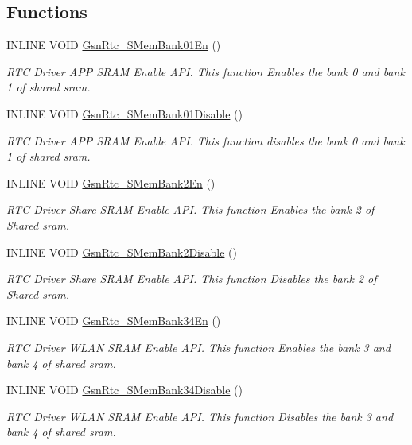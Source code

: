 \subsection*{Functions}
\begin{DoxyCompactItemize}
\item 
INLINE VOID \hyperlink{a00651_ga6b4bcb149ee20725f2fc899a65d7fdf9}{GsnRtc\_\-SMemBank01En} ()
\begin{DoxyCompactList}\small\item\em RTC Driver APP SRAM Enable API. This function Enables the bank 0 and bank 1 of shared sram. \end{DoxyCompactList}\item 
INLINE VOID \hyperlink{a00651_ga7adb0e944f2c0f0dfffddd0afca63382}{GsnRtc\_\-SMemBank01Disable} ()
\begin{DoxyCompactList}\small\item\em RTC Driver APP SRAM Enable API. This function disables the bank 0 and bank 1 of shared sram. \end{DoxyCompactList}\item 
INLINE VOID \hyperlink{a00651_ga7540c91773261a93185b2bef4969277a}{GsnRtc\_\-SMemBank2En} ()
\begin{DoxyCompactList}\small\item\em RTC Driver Share SRAM Enable API. This function Enables the bank 2 of Shared sram. \end{DoxyCompactList}\item 
INLINE VOID \hyperlink{a00651_gae72a40c37c187ab506437b3592a59cf2}{GsnRtc\_\-SMemBank2Disable} ()
\begin{DoxyCompactList}\small\item\em RTC Driver Share SRAM Enable API. This function Disables the bank 2 of Shared sram. \end{DoxyCompactList}\item 
INLINE VOID \hyperlink{a00651_ga7b62ca77d978a7abc09284be65ea845e}{GsnRtc\_\-SMemBank34En} ()
\begin{DoxyCompactList}\small\item\em RTC Driver WLAN SRAM Enable API. This function Enables the bank 3 and bank 4 of shared sram. \end{DoxyCompactList}\item 
INLINE VOID \hyperlink{a00651_ga0fae00cfd76574f86968b438f6ce9e02}{GsnRtc\_\-SMemBank34Disable} ()
\begin{DoxyCompactList}\small\item\em RTC Driver WLAN SRAM Enable API. This function Disables the bank 3 and bank 4 of shared sram. \end{DoxyCompactList}\item 

\end{DoxyCompactItemize}
